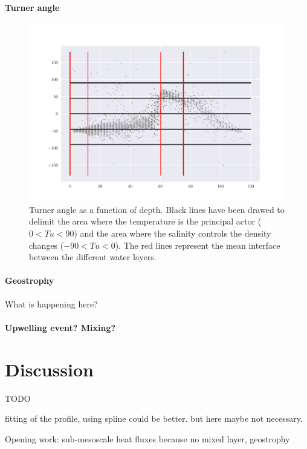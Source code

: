 \documentclass[12pt,a4paper]{article}
\begin{document}
\paragraph{Turner angle}
\begin{figure}
  \centering
  \includegraphics{turner}
  \caption{\label{fig:turner}Turner angle as a function of depth.
    Black lines have been drawed to delimit the area where the temperature
    is the principal actor ($0<Tu<90$)
    and the area where the salinity controls the density changes ($-90<Tu<0$).
    The red lines represent the mean interface between the different water layers.}
\end{figure}

\paragraph{Geostrophy}
What is happening here?

\paragraph{Upwelling event? Mixing?}
\citep{arneborg2003,bjork2003}

\section{Discussion}

TODO

fitting of the profile, using spline could be better. but here maybe not necessary. 

Opening work: sub-mesoscale heat fluxes because no mixed layer, geostrophy
\end{document}
